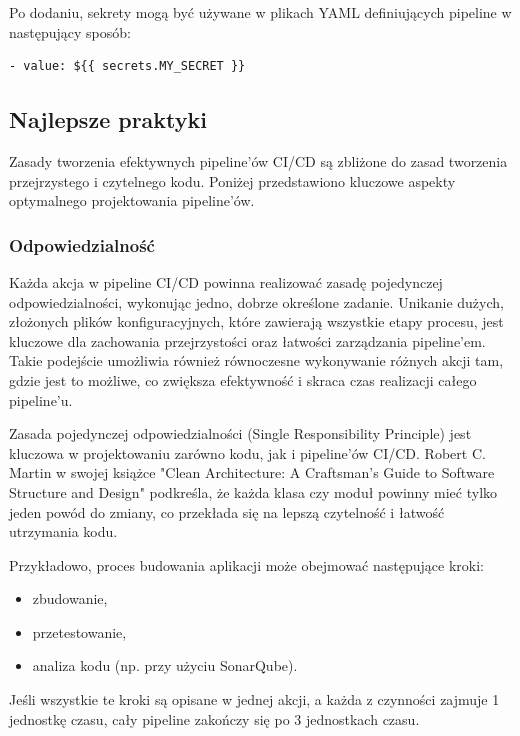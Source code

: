 \documentclass{article}
\begin{document}
Po dodaniu, sekrety mogą być używane w plikach YAML definiujących pipeline w następujący sposób:

\begin{lstlisting}[caption=Przykładowa konfiguracja pipeline'u w Github Actions]
- value: ${{ secrets.MY_SECRET }}
\end{lstlisting}

\subsection{Najlepsze praktyki}
Zasady tworzenia efektywnych pipeline'ów CI/CD są zbliżone do zasad tworzenia przejrzystego i czytelnego kodu. Poniżej przedstawiono kluczowe aspekty optymalnego projektowania pipeline'ów.

\subsubsection{Odpowiedzialność}

Każda akcja w pipeline CI/CD powinna realizować zasadę pojedynczej odpowiedzialności, wykonując jedno, dobrze określone zadanie. Unikanie dużych, złożonych plików konfiguracyjnych, które zawierają wszystkie etapy procesu, jest kluczowe dla zachowania przejrzystości oraz łatwości zarządzania pipeline’em. Takie podejście umożliwia również równoczesne wykonywanie różnych akcji tam, gdzie jest to możliwe, co zwiększa efektywność i skraca czas realizacji całego pipeline’u.

Zasada pojedynczej odpowiedzialności (Single Responsibility Principle) jest kluczowa w projektowaniu zarówno kodu, jak i pipeline'ów CI/CD. Robert C. Martin w swojej książce "Clean Architecture: A Craftsman's Guide to Software Structure and Design" \cite{cleanArchitecture} podkreśla, że każda klasa czy moduł powinny mieć tylko jeden powód do zmiany, co przekłada się na lepszą czytelność i łatwość utrzymania kodu.

Przykładowo, proces budowania aplikacji może obejmować następujące kroki:

\begin{itemize}
    \item zbudowanie,
    \item przetestowanie,
    \item analiza kodu (np. przy użyciu SonarQube).
\end{itemize}

Jeśli wszystkie te kroki są opisane w jednej akcji, a każda z czynności zajmuje 1 jednostkę czasu, cały pipeline zakończy się po 3 jednostkach czasu.
\end{document}
